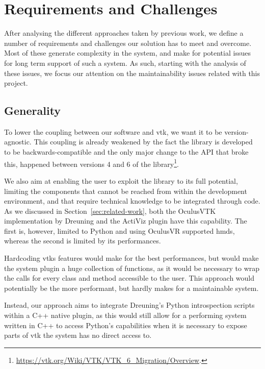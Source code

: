 \chapter{Requirements and Challenges}
\label{ch:unmaintainability}

After analysing the different approaches taken by previous work, we define a number of requirements and challenges our solution has to meet and overcome. Most of these generate complexity in the system, and make for potential issues for long term support of such a system. As such, starting with the analysis of these issues, we focus our attention on the maintainability issues related with this project.

\section{Generality}
\label{sec:complexity-generality}

To lower the coupling between our software and \acrshort{vtk}, we want it to be version-agnostic. This coupling is already weakened by the fact the library is developed to be backwards-compatible and the only major change to the API that broke this, happened between versions 4 and 6 of the library\footnote{\url{https://vtk.org/Wiki/VTK/VTK\_6\_Migration/Overview}.}. 

We also aim at enabling the user to exploit the library to its full potential, limiting the components that cannot be reached from within the development environment, and that require technical knowledge to be integrated through code. As we discussed in Section~\ref{sec:related-work}, both the OculusVTK implementation by Dreuning and the ActiViz plugin have this capability. The first is, however, limited to Python and using OculusVR supported \acrshort{hmd}s, whereas the second is limited by its performances. 

Hardcoding \acrshort{vtk}s features would make for the best performances, but would make the system plugin a huge collection of functions, as it would be necessary to wrap the calls for every class and method accessible to the user. This approach would potentially be the more performant, but hardly makes for a maintainable system.

Instead, our approach aims to integrate Dreuning's Python introspection scripts within a C++ native plugin, as this would still allow for a performing system written in C++ to access Python's capabilities when it is necessary to expose parts of \acrshort{vtk} the system has no direct access to.

